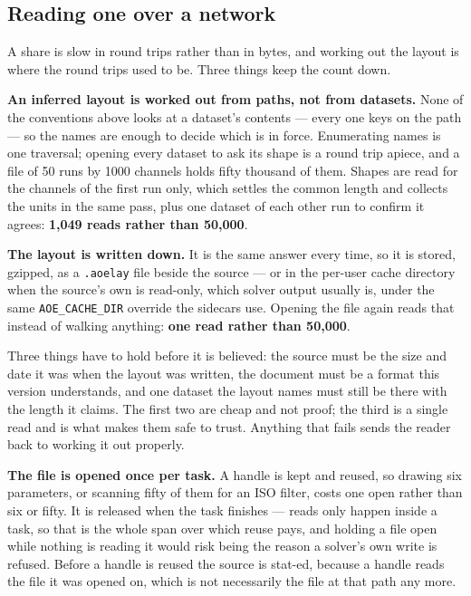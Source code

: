 \documentclass[11pt,a4paper,oneside]{report}
\newcommand{\code}[1]{\texttt{#1}}
\begin{document}
\subsection*{Reading one over a network}

A share is slow in round trips rather than in bytes, and working out the layout
is where the round trips used to be. Three things keep the count down.

\textbf{An inferred layout is worked out from paths, not from datasets.} None
of the conventions above looks at a dataset's contents --- every one keys on the path
--- so the names are enough to decide which is in force. Enumerating names is
one traversal; opening every dataset to ask its shape is a round trip apiece,
and a file of 50 runs by 1000 channels holds fifty thousand of them. Shapes are
read for the channels of the first run only, which settles the common length
and collects the units in the same pass, plus one dataset of each other run to
confirm it agrees: \textbf{1,049 reads rather than 50,000}.

\textbf{The layout is written down.} It is the same answer every time, so it is
stored, gzipped, as a \code{.aoelay} file beside the source --- or in the
per-user cache directory when the source's own is read-only, which solver
output usually is, under the same \code{AOE\_CACHE\_DIR} override the sidecars
use. Opening the file again reads that instead of walking anything:
\textbf{one read rather than 50,000}.

Three things have to hold before it is believed: the source must be the size
and date it was when the layout was written, the document must be a format this
version understands, and one dataset the layout names must still be there with
the length it claims. The first two are cheap and not proof; the third is a
single read and is what makes them safe to trust. Anything that fails sends the
reader back to working it out properly.

\textbf{The file is opened once per task.} A handle is kept and reused, so
drawing six parameters, or scanning fifty of them for an ISO filter, costs one
open rather than six or fifty. It is released when the task finishes --- reads
only happen inside a task, so that is the whole span over which reuse pays, and
holding a file open while nothing is reading it would risk being the reason a
solver's own write is refused. Before a handle is reused the source is stat-ed,
because a handle reads the file it was opened on, which is not necessarily the
file at that path any more.
\end{document}
